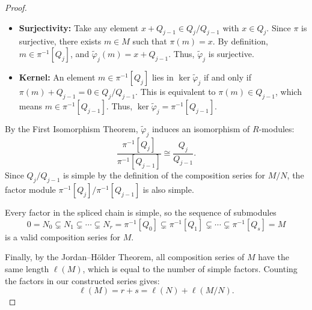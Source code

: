 \documentclass[11pt]{article}
\begin{document}
\begin{proof}
\begin{enumerate}
        \begin{itemize}
            \item \textbf{Surjectivity:} Take any element $x + Q_{j-1} \in Q_j / Q_{j-1}$ with $x \in Q_j$. Since $\pi$ is surjective, there exists $m \in M$ such that $\pi(m) = x$. By definition, $m \in \pi^{-1}[Q_j]$, and $\tilde{\varphi}_j(m) = x + Q_{j-1}$. Thus, $\tilde{\varphi}_j$ is surjective.
            \item \textbf{Kernel:} An element $m \in \pi^{-1}[Q_j]$ lies in $\ker \tilde{\varphi}_j$ if and only if $\pi(m) + Q_{j-1} = 0 \in Q_j / Q_{j-1}$. This is equivalent to $\pi(m) \in Q_{j-1}$, which means $m \in \pi^{-1}[Q_{j-1}]$. Thus, $\ker \tilde{\varphi}_j = \pi^{-1}[Q_{j-1}]$.
        \end{itemize}

        By the First Isomorphism Theorem, $\tilde{\varphi}_j$ induces an isomorphism of $R$-modules:
        \[
            \frac{\pi^{-1}[Q_j]}{\pi^{-1}[Q_{j-1}]} \cong \frac{Q_j}{Q_{j-1}}.
        \]
        Since $Q_j / Q_{j-1}$ is simple by the definition of the composition series for $M/N$, the factor module $\pi^{-1}[Q_j] / \pi^{-1}[Q_{j-1}]$ is also simple.
    \end{enumerate}

    Every factor in the spliced chain is simple, so the sequence of submodules
    \[
        0 = N_0 \subsetneq N_1 \subsetneq \cdots \subsetneq N_r = \pi^{-1}[Q_0] \subsetneq \pi^{-1}[Q_1] \subsetneq \cdots \subsetneq \pi^{-1}[Q_s] = M
    \]
    is a valid composition series for $M$.

    Finally, by the Jordan--Hölder Theorem, all composition series of $M$ have the same length $\ell(M)$, which is equal to the number of simple factors. Counting the factors in our constructed series gives:
    \[
        \ell(M) = r + s = \ell(N) + \ell(M/N).
    \]
\end{proof}
\end{document}
